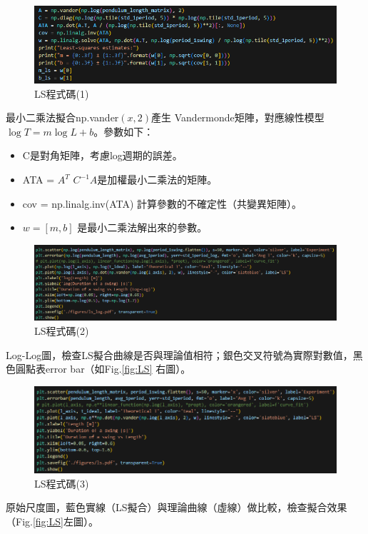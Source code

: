 \documentclass[12pt,a4paper]{article}
\begin{document}
\begin{CJK}{UTF8}{bkai}
\begin{figure}[h]
    \centering
    \includegraphics[width=1\linewidth]{LS1.png}
    \caption{LS程式碼(1)}
    \label{fig:LS1}
\end{figure}
\indent 最小二乘法擬合np.vander$(x, 2)$產生 Vandermonde矩陣，對應線性模型$\log T=m\log L+b$。參數如下：\\
\begin{itemize}
    \item C是對角矩陣，考慮log週期的誤差。
    \item ATA = $A^T$ $C^{-1}A$是加權最小二乘法的矩陣。
    \item cov = np.linalg.inv(ATA) 計算參數的不確定性（共變異矩陣）。
    \item $w = [m, b]$ 是最小二乘法解出來的參數。
\end{itemize}

\clearpage

\begin{figure}[h]
    \centering
    \includegraphics[width=1\linewidth]{LS2.png}
    \caption{LS程式碼(2)}
    \label{fig:LS2}
\end{figure}
\indent Log-Log圖，檢查LS擬合曲線是否與理論值相符；銀色交叉符號為實際對數值，黑色圓點表error bar（如Fig.\ref{fig:LS}
右圖）。

\begin{figure}[h]
    \centering
    \includegraphics[width=1\linewidth]{LS3.png}
    \caption{LS程式碼(3)}
    \label{fig:LS3}
\end{figure}
\indent 原始尺度圖，藍色實線（LS擬合）與理論曲線（虛線）做比較，檢查擬合效果（Fig.\ref{fig:LS}左圖）。


\end{CJK}
\end{document}
